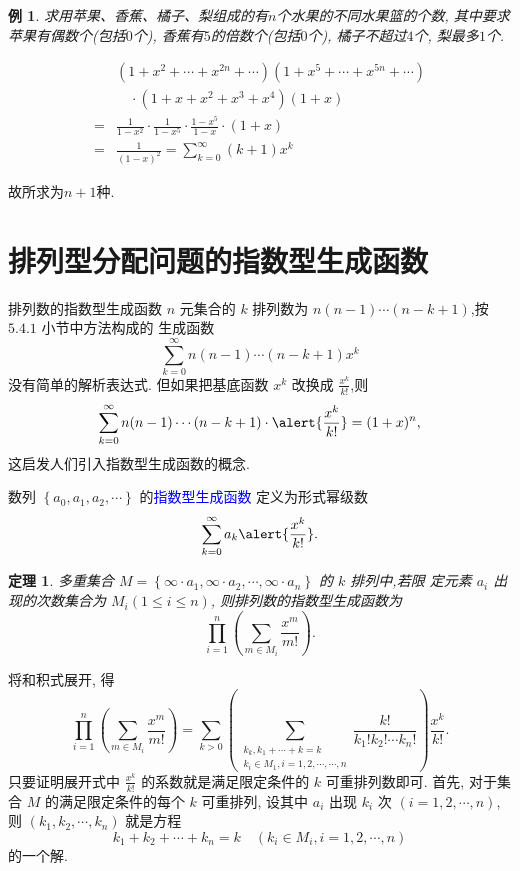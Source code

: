 \documentclass[punct]{ctexbeamer}
\newtheorem{thm}{定理}[section]
\newtheorem{ex}{例}[section]
\newcommand{\blue}{\textcolor{blue}}
\def\pf{\noindent {\bf 证明\ }}
\def\sol{\noindent {\bf 解\ }}
\begin{document}
\begin{frame}
	\begin{ex}
		求用苹果、香蕉、橘子、梨组成的有$n$个水果的不同水果篮的个数, 其中要求苹果有偶数个(包括$0$个), 香蕉有$5$的倍数个(包括$0$个), 橘子不超过$4$个, 梨最多$1$个.
	\end{ex}
\pause
\sol $$
\begin{aligned}
&\left(1+x^{2}+\cdots+x^{2 n}+\cdots\right)\left(1+x^{5}+\cdots+x^{5 n}+\cdots\right)\\
&\quad\cdot \left(1+x+x^{2}+x^{3}+x^{4}\right)(1+x)\\
=&\frac{1}{1-x^{2}} \cdot \frac{1}{1-x^{5}} \cdot \frac{1-x^{5}}{1-x} \cdot(1+x)\\
=&\frac{1}{(1-x)^{2}}=\sum_{k=0}^{\infty}(k+1) x^{k}
\end{aligned}$$

故所求为$n+1$种.
\end{frame}

\section{排列型分配问题的指数型生成函数}
\begin{frame}{排列数的指数型生成函数}
	$n$ 元集合的 $k$ 排列数为 $n(n-1) \cdots(n-k+1)$,按 $5.4 .1$ 小节中方法构成的 生成函数
	$$
	\sum_{k=0}^{\infty} n(n-1) \cdots(n-k+1) x^{k}
	$$
	没有简单的解析表达式.
    \pause
    但如果把基底函数 $x^{k}$ 改换成 $\frac{x^{k}}{k !}$,则
	$$
	\sum_{k=0}^{\infty} n(n-1) \cdots(n-k+1) \cdot \alert{\frac{x^{k}}{k !}}=(1+x)^{n},
	$$
	这启发人们引入指数型生成函数的概念.

	数列 $\left\{a_{0}, a_{1}, a_{2}, \cdots\right\}$ 的\blue{指数型生成函数} 定义为形式幂级数
	$$
	\sum_{k=0}^{\infty} a_{k} \alert{ \frac{x^{k}}{k !}}.
	$$
\end{frame}

\begin{frame}
	\begin{thm}
		多重集合 $M=\left\{\infty \cdot a_{1}, \infty \cdot a_{2}, \cdots, \infty \cdot a_{n}\right\}$ 的 $k$ 排列中,若限 定元素 $a_{i}$ 出现的次数集合为 $M_{i}(1 \leqslant i \leqslant n)$, 则排列数的指数型生成函数为
		$$
		\prod_{i=1}^{n}\left(\sum_{m \in M_{i}} \frac{x^{m}}{m !}\right).
		$$
	\end{thm}
\pf 将和积式展开, 得
$$
\prod_{i=1}^n\left(\sum_{m \in M_i} \frac{x^m}{m !}\right)=\sum_{k>0}\left(\sum_{\substack{k_k, k_1+\cdots+k=k \\ k_i \in M_1, i=1,2, \cdots, \cdots, n}} \frac{k !}{k_{1} ! k_{2} ! \cdots k_{n} !}\right) \frac{x^k}{k !} .
$$
只要证明展开式中 $\frac{x^k}{k !}$ 的系数就是满足限定条件的 $k$ 可重排列数即可.
首先, 对于集合 $M$ 的满足限定条件的每个 $k$ 可重排列, 设其中 $a_i$ 出现 $k_i$ 次 $(i=1,2, \cdots, n)$, 则 $\left(k_1, k_2, \cdots, k_n\right)$ 就是方程
$$
k_1+k_2+\cdots+k_n=k \quad\left(k_i \in M_i, i=1,2, \cdots, n\right)
$$
的一个解.
\end{frame}
\end{document}
